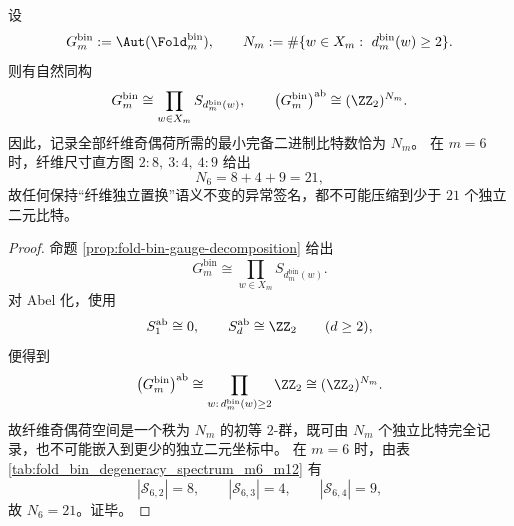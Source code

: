 \begin{theorem}[纤维奇偶荷的最小完备比特数等于非平凡纤维数]\label{thm:gut-fiber-parity-minimal-complete-bits}
设
\[
G_m^{\mathrm{bin}}:=\Aut(\Fold_m^{\mathrm{bin}}),
\qquad
N_m:=\#\{w\in X_m:\ d_m^{\mathrm{bin}}(w)\ge 2\}.
\]
则有自然同构
\[
G_m^{\mathrm{bin}}\cong \prod_{w\in X_m} S_{d_m^{\mathrm{bin}}(w)},
\qquad
\bigl(G_m^{\mathrm{bin}}\bigr)^{\mathrm{ab}}\cong (\ZZ_2)^{N_m}.
\]
因此，记录全部纤维奇偶荷所需的最小完备二进制比特数恰为 \(N_m\)。
在 \(m=6\) 时，纤维尺寸直方图 \(2:8,\ 3:4,\ 4:9\) 给出
\[
N_6=8+4+9=21,
\]
故任何保持“纤维独立置换”语义不变的异常签名，都不可能压缩到少于 \(21\) 个独立二元比特。
\end{theorem}
\begin{proof}
命题 \ref{prop:fold-bin-gauge-decomposition} 给出
\[
G_m^{\mathrm{bin}}\cong \prod_{w\in X_m} S_{d_m^{\mathrm{bin}}(w)}.
\]
对 Abel 化，使用
\[
S_1^{\mathrm{ab}}\cong 0,
\qquad
S_d^{\mathrm{ab}}\cong \ZZ_2\qquad(d\ge 2),
\]
便得到
\[
\bigl(G_m^{\mathrm{bin}}\bigr)^{\mathrm{ab}}
\cong
\prod_{w:\,d_m^{\mathrm{bin}}(w)\ge 2}\ZZ_2
\cong
(\ZZ_2)^{N_m}.
\]
故纤维奇偶荷空间是一个秩为 \(N_m\) 的初等 \(2\)-群，既可由 \(N_m\) 个独立比特完全记录，也不可能嵌入到更少的独立二元坐标中。
在 \(m=6\) 时，由表 \ref{tab:fold_bin_degeneracy_spectrum_m6_m12} 有
\[
|\mathcal S_{6,2}|=8,\qquad |\mathcal S_{6,3}|=4,\qquad |\mathcal S_{6,4}|=9,
\]
故 \(N_6=21\)。证毕。
\end{proof}

